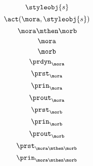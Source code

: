 {\begin{forslides}
        \begin{equation}
            \label{eq:signal}
            \styleobj{s}
        \end{equation}
        \begin{equation}
            \label{eq:signal-apply}
            \act(\mora, \styleobj{s})
        \end{equation}
        \begin{equation}
            \label{eq:morab}
            \mora \mthen \morb
        \end{equation}
        \begin{equation}
            \label{eq:mora}
            \mora
        \end{equation}
        \begin{equation}
            \label{eq:morb}
            \morb
        \end{equation}
        \begin{equation}
            \label{eq:mora-prdyn}
            \prdyn_{\mora}
        \end{equation}
        \begin{equation}
            \label{eq:mora-prst}
            \prst_{\mora}
        \end{equation}
        \begin{equation}
            \label{eq:mora-prin}
            \prin_{\mora}
        \end{equation}
        \begin{equation}
            \label{eq:mora-prout}
            \prout_{\mora}
        \end{equation}
        \begin{equation}
            \label{eq:morb-prst}
            \prst_{\morb}
        \end{equation}
        \begin{equation}
            \label{eq:morb-prin}
            \prin_{\morb}
        \end{equation}
        \begin{equation}
            \label{eq:morb-prout}
            \prout_{\morb}
        \end{equation}
        \begin{equation}
            \label{eq:morab-prst}
            \prst_{\mora\mthen\morb}
        \end{equation}
        \begin{equation}
            \label{eq:morab-prin}
            \prin_{\mora\mthen\morb}
        \end{equation}

\end{forslides}}
